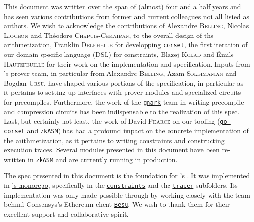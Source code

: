 This document was written over the span of (almost) four and a half years and has seen various contributions from former and current colleagues not all listed as authors.
We wish to acknowledge the contributions of
Alexandre \textsc{Belling},
Nicolas \textsc{Liochon} and
Théodore \textsc{Chapuis-Chkaiban},
to the overall design of the arithmetization,
Franklin \textsc{Delehelle} for developping \href{https://github.com/Consensys/corset}{\texttt{corset}},
the first iteration of our domain specific language (DSL) for constraints,
Blazej \textsc{Kolad} and
\'{E}mile \textsc{Hautefeuille} for their work on the implementation and specification.
Inputs from \linea{}'s prover team, in particular from
Alexandre \textsc{Belling},
Azam \textsc{Soleimanian} and
Bogdan \textsc{Ursu},
have shaped various portions of the specification,
in particular as it pertains to setting up interfaces with prover modules and specialized circuits for precompiles.
Furthermore, the work of the \href{https://github.com/Consensys/gnark}{\texttt{gnark}} team
in writing precompile and compression circuits has been indispensable to the realization of this spec.
Last, but certainly not least, the work of David \textsc{Pearce}
on our tooling (\href{https://github.com/Consensys/go-corset}{\texttt{go-corset}} and \texttt{zkASM})
has had a profound impact on the concrete implementation of the arithmetization,
as it pertains to writing constraints and constructing execution traces.
Several modules presented in this document have been re-written in \texttt{zkASM} and are currently running in production.

The spec presented in this document is the foundation for \linea{}'s \zkEvm{}.
It was implemented in \href{https://github.com/Consensys/linea-monorepo}{\linea{}'s monorepo},
specifically in the \href{https://github.com/Consensys/linea-monorepo/tree/main/tracer-constraints}{\texttt{constraints}}
and the \href{https://github.com/Consensys/linea-monorepo/tree/main/tracer}{\texttt{tracer}} subfolders.
Its implementation was only made possible through by working closely with the team behind
Consensys's Ethereum client \href{https://github.com/besu-eth/besu}{\texttt{Besu}}.
We wish to thank them for their excellent support and collaborative spirit.
